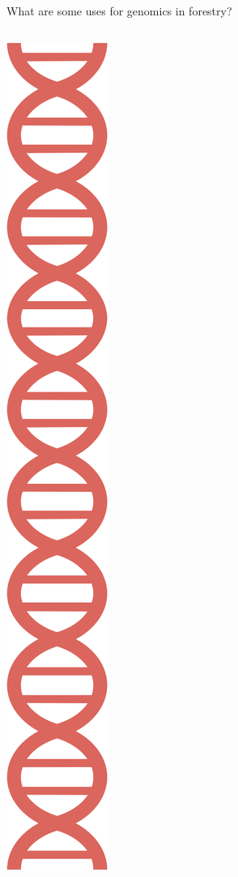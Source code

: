 \documentclass{beamer}
\begin{document}
\begin{frame}
	\centering
	
	\Huge What are some uses for genomics in forestry?
\end{frame}


\begin{frame}
	\begin{columns}
		\begin{column}{0.1\textwidth}
			\includegraphics[keepaspectratio, width  =\textwidth]{img/dnaCartoon}

\end{column}
\end{columns}
\end{frame}
\end{document}
